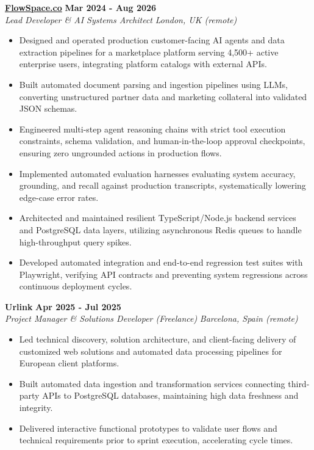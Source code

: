 \documentclass[10pt,a4paper]{article}
\newcommand{\role}[4]{%
  \textbf{#1} \hfill \textbf{#2}\\[1pt]%
  \textit{#3} \hfill \textit{#4}\\[2pt]%
}
\begin{document}
\role{\href{https://flowspace.co}{FlowSpace.co}}{Mar 2024 - Aug 2026}{Lead Developer \& AI Systems Architect}{London, UK (remote)}
\begin{itemize}
  \item Designed and operated production customer-facing AI agents and data extraction pipelines for a marketplace platform serving 4,500+ active enterprise users, integrating platform catalogs with external APIs.
  \item Built automated document parsing and ingestion pipelines using LLMs, converting unstructured partner data and marketing collateral into validated JSON schemas.
  \item Engineered multi-step agent reasoning chains with strict tool execution constraints, schema validation, and human-in-the-loop approval checkpoints, ensuring zero ungrounded actions in production flows.
  \item Implemented automated evaluation harnesses evaluating system accuracy, grounding, and recall against production transcripts, systematically lowering edge-case error rates.
  \item Architected and maintained resilient TypeScript/Node.js backend services and PostgreSQL data layers, utilizing asynchronous Redis queues to handle high-throughput query spikes.
  \item Developed automated integration and end-to-end regression test suites with Playwright, verifying API contracts and preventing system regressions across continuous deployment cycles.
\end{itemize}

\role{Urlink}{Apr 2025 - Jul 2025}{Project Manager \& Solutions Developer (Freelance)}{Barcelona, Spain (remote)}
\begin{itemize}
  \item Led technical discovery, solution architecture, and client-facing delivery of customized web solutions and automated data processing pipelines for European client platforms.
  \item Built automated data ingestion and transformation services connecting third-party APIs to PostgreSQL databases, maintaining high data freshness and integrity.
  \item Delivered interactive functional prototypes to validate user flows and technical requirements prior to sprint execution, accelerating cycle times.
\end{itemize}
\end{document}
